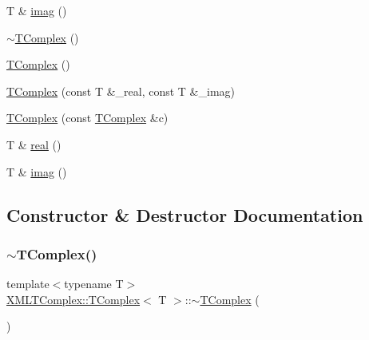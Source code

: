 \begin{DoxyCompactItemize}
\item 
T \& \mbox{\hyperlink{classXMLTComplex_1_1TComplex_af991451a5500d81f96df2a39d70d7196}{imag}} ()
\item 
\mbox{\hyperlink{classXMLTComplex_1_1TComplex_ac5ecd1b7db17431803816caf30e4ddc1}{$\sim$\+T\+Complex}} ()
\item 
\mbox{\hyperlink{classXMLTComplex_1_1TComplex_a14dd2bcde2b707f8040fbf68bf3c0266}{T\+Complex}} ()
\item 
\mbox{\hyperlink{classXMLTComplex_1_1TComplex_a004b4c926f786993fbcc127c01841cd2}{T\+Complex}} (const T \&\+\_\+real, const T \&\+\_\+imag)
\item 
\mbox{\hyperlink{classXMLTComplex_1_1TComplex_a8c19071c0c720ddbcf4232418b8b4a19}{T\+Complex}} (const \mbox{\hyperlink{classXMLTComplex_1_1TComplex}{T\+Complex}} \&c)
\item 
T \& \mbox{\hyperlink{classXMLTComplex_1_1TComplex_a3f7e9b8dd1c6a18da9a944d51d8118c9}{real}} ()
\item 
T \& \mbox{\hyperlink{classXMLTComplex_1_1TComplex_af991451a5500d81f96df2a39d70d7196}{imag}} ()
\end{DoxyCompactItemize}


\subsection{Constructor \& Destructor Documentation}
\mbox{\label{classXMLTComplex_1_1TComplex_ac5ecd1b7db17431803816caf30e4ddc1}} 
\subsubsection{\texorpdfstring{$\sim$TComplex()}{~TComplex()}\hspace{0.1cm}{\footnotesize\ttfamily [1/3]}}
{\footnotesize\ttfamily template$<$typename T$>$ \\
\mbox{\hyperlink{classXMLTComplex_1_1TComplex}{X\+M\+L\+T\+Complex\+::\+T\+Complex}}$<$ T $>$\+::$\sim$\mbox{\hyperlink{classXMLTComplex_1_1TComplex}{T\+Complex}} (\begin{DoxyParamCaption}{ }\end{DoxyParamCaption})\hspace{0.3cm}{\ttfamily [inline]}}

